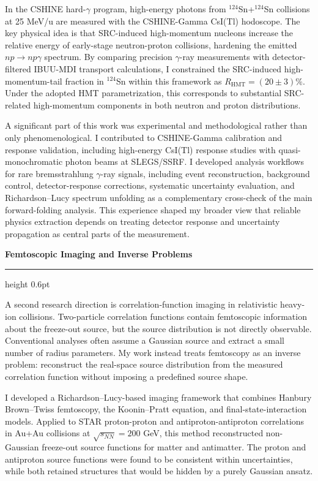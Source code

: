 \documentclass[10pt]{article}
\newcommand{\rssection}[1]{%
  \vspace{0.85em}
  {\large\bfseries\color{accent} #1}\par
  \vspace{0.2em}
  {\color{rule}\hrule height 0.6pt}
  \vspace{0.45em}
}
\newcommand{\bodypar}[1]{%
  {\normalsize #1\par}
  \vspace{0.58em}
}
\begin{document}
\bodypar{In the CSHINE hard-$\gamma$ program, high-energy photons from ${}^{124}$Sn+${}^{124}$Sn collisions at 25 MeV/u are measured with the CSHINE-Gamma CsI(Tl) hodoscope. The key physical idea is that SRC-induced high-momentum nucleons increase the relative energy of early-stage neutron-proton collisions, hardening the emitted $np\rightarrow np\gamma$ spectrum. By comparing precision $\gamma$-ray measurements with detector-filtered IBUU-MDI transport calculations, I constrained the SRC-induced high-momentum-tail fraction in ${}^{124}$Sn within this framework as \(R_{\mathrm{HMT}}=(20\pm3)\%\). Under the adopted HMT parametrization, this corresponds to substantial SRC-related high-momentum components in both neutron and proton distributions.}

\bodypar{A significant part of this work was experimental and methodological rather than only phenomenological. I contributed to CSHINE-Gamma calibration and response validation, including high-energy CsI(Tl) response studies with quasi-monochromatic photon beams at SLEGS/SSRF. I developed analysis workflows for rare bremsstrahlung $\gamma$-ray signals, including event reconstruction, background control, detector-response corrections, systematic uncertainty evaluation, and Richardson--Lucy spectrum unfolding as a complementary cross-check of the main forward-folding analysis. This experience shaped my broader view that reliable physics extraction depends on treating detector response and uncertainty propagation as central parts of the measurement.}

\rssection{Femtoscopic Imaging and Inverse Problems}
\bodypar{A second research direction is correlation-function imaging in relativistic heavy-ion collisions. Two-particle correlation functions contain femtoscopic information about the freeze-out source, but the source distribution is not directly observable. Conventional analyses often assume a Gaussian source and extract a small number of radius parameters. My work instead treats femtoscopy as an inverse problem: reconstruct the real-space source distribution from the measured correlation function without imposing a predefined source shape.}

\bodypar{I developed a Richardson--Lucy-based imaging framework that combines Hanbury Brown--Twiss femtoscopy, the Koonin--Pratt equation, and final-state-interaction models. Applied to STAR proton-proton and antiproton-antiproton correlations in Au+Au collisions at \(\sqrt{s_{NN}}=200\) GeV, this method reconstructed non-Gaussian freeze-out source functions for matter and antimatter. The proton and antiproton source functions were found to be consistent within uncertainties, while both retained structures that would be hidden by a purely Gaussian ansatz.}
\end{document}
